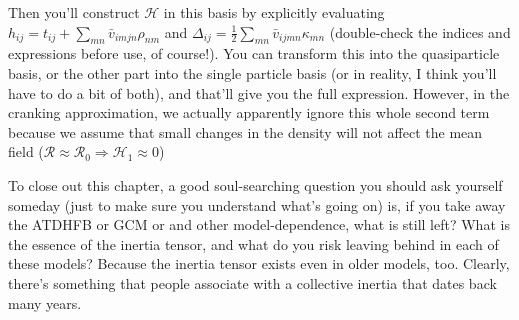 \noindent Then you'll construct $\mathcal{H}$ in this basis by explicitly evaluating $h_{ij} = t_{ij} + \sum_{mn}\bar{v}_{imjn}\rho_{nm}$ and $\Delta_{ij} = \frac{1}{2}\sum_{mn}\bar{v}_{ijmn}\kappa_{mn}$ (double-check the indices and expressions before use, of course!). You can transform this into the quasiparticle basis, or the other part into the single particle basis (or in reality, I think you'll have to do a bit of both), and that'll give you the full expression. However, in the cranking approximation, we actually apparently ignore this whole second term because we assume that small changes in the density will not affect the mean field ($\mathcal{R}\approx\mathcal{R}_0 \Rightarrow\mathcal{H}_1\approx0$)

To close out this chapter, a good soul-searching question you should ask yourself someday (just to make sure you understand what's going on) is, if you take away the ATDHFB or GCM or and other model-dependence, what is still left? What is the essence of the inertia tensor, and what do you risk leaving behind in each of these models? Because the inertia tensor exists even in older models, too. Clearly, there's something that people associate with a collective inertia that dates back many years.